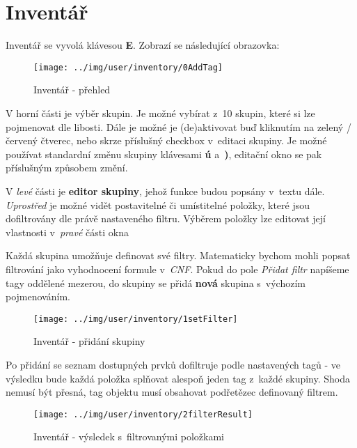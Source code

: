
\section{Inventář}

Inventář se vyvolá klávesou \textbf{E}. Zobrazí se následující obrazovka:

\begin{figure}[!ht]\centering
\texttt{[image: ../img/user/inventory/0AddTag]}

\caption{Inventář - přehled}
\label{fig:user_inventory_0AddTag}

\end{figure}

\FloatBarrier

V horní části je výběr skupin. Je možné vybírat z~10 skupin, které si lze pojmenovat dle libosti. Dále je možné je (de)aktivovat buď kliknutím na zelený / červený čtverec, nebo skrze příslušný checkbox v~editaci skupiny.
Je možné používat standardní změnu skupiny klávesami \textbf{ú} a~\textbf{)}, editační okno se pak příslušným způsobem změní. 

V \textit{levé} části je \textbf{editor skupiny}, jehož funkce budou popsány v~textu dále. \textit{Uprostřed} je možné vidět postavitelné či umístitelné položky, které jsou dofiltrovány dle právě nastaveného filtru. Výběrem položky lze editovat její vlastnosti v~\textit{pravé} části okna

\FloatBarrier

Každá skupina umožňuje definovat své filtry. Matematicky bychom mohli popsat filtrování jako vyhodnocení formule v~\textit{CNF}. Pokud do pole \textit{Přidat filtr} napíšeme tagy oddělené mezerou, do skupiny se přidá \textbf{nová} skupina s~výchozím pojmenováním.

\begin{figure}[!ht]\centering
\texttt{[image: ../img/user/inventory/1setFilter]}

\caption{Inventář - přidání skupiny}
\label{fig:user_inventory_1setFilter}

\end{figure}

\FloatBarrier

Po přidání se seznam dostupných prvků dofiltruje podle nastavených tagů - ve výsledku bude každá položka splňovat alespoň jeden tag z~každé skupiny. Shoda nemusí být přesná, tag objektu musí obsahovat podřetězec definovaný filtrem.
\begin{figure}[!ht]\centering
\texttt{[image: ../img/user/inventory/2filterResult]}

\caption{Inventář - výsledek s~filtrovanými položkami}
\label{fig:user_inventory_2filterResult}

\end{figure}

